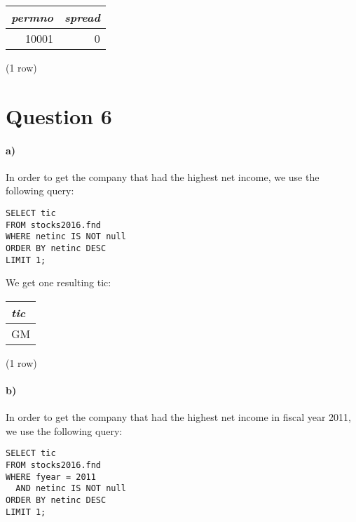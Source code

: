 \documentclass[]{article}
\let\oldparagraph\paragraph
\renewcommand{\paragraph}[1]{\oldparagraph{#1}\mbox{}}
\begin{document}
\begin{center}
\begin{tabular}{|r | r|}
\hline
\textit{permno} & \textit{spread} \\
\hline
10001 & 0 \\
\hline
\end{tabular}

\noindent (1 row) \\
\end{center}


\section*{Question 6}
\paragraph{a)}
In order to get the company that had the highest net income, we use the following query:

\color{blue}
\begin{verbatim}
SELECT tic
FROM stocks2016.fnd
WHERE netinc IS NOT null
ORDER BY netinc DESC
LIMIT 1;
\end{verbatim}
\color{black}

We get one resulting tic:

\begin{center}
\begin{tabular}{|l|}
\hline
\textit{tic} \\
\hline
GM \\
\hline
\end{tabular}

\noindent (1 row) \\
\end{center}

\paragraph{b)}
In order to get the company that had the highest net income in fiscal year 2011, we use the following query:

\color{blue}
\begin{verbatim}
SELECT tic
FROM stocks2016.fnd
WHERE fyear = 2011
  AND netinc IS NOT null
ORDER BY netinc DESC
LIMIT 1;
\end{verbatim}
\color{black}
\end{document}
